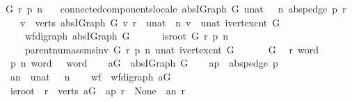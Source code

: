 \begin{isabellebody}
{\isachardoublequoteopen}{\isasymAnd}G\ r\ p\ n{\isachardot}\ \isanewline
\ \ {\isacharparenleft}connected{\isacharunderscore}components{\isacharunderscore}locale\ {\isacharparenleft}abs{\isacharunderscore}IGraph\ G{\isacharparenright}\ {\isacharparenleft}unat\ {\isasymcirc}\ \ n{\isacharparenright}\ {\isacharparenleft}abs{\isacharunderscore}pedge\ p{\isacharparenright}\ r\ \isanewline
\ \ {\isasymand}\ {\isacharparenleft}{\isasymforall}v\ {\isasymin}\ verts\ {\isacharparenleft}abs{\isacharunderscore}IGraph\ G{\isacharparenright}{\isachardot}\ v{\isasymnoteq}\ r\ {\isasymlongrightarrow}\ {\isacharparenleft}unat\ {\isasymcirc}\ n{\isacharparenright}\ v\ {\isacharless}\ unat\ {\isacharparenleft}ivertex{\isacharunderscore}cnt\ G{\isacharparenright}{\isacharparenright}{\isacharparenright}\ {\isacharequal}\ \isanewline
\ \ \ \ {\isacharparenleft}wf{\isacharunderscore}digraph\ {\isacharparenleft}abs{\isacharunderscore}IGraph\ G{\isacharparenright}\ {\isasymand}\ \isanewline
\ \ \ \ is{\isacharunderscore}root\ G\ r\ p\ n\ {\isasymand}\ \isanewline
\ \ \ \ parent{\isacharunderscore}num{\isacharunderscore}assms{\isacharunderscore}inv\ G\ r\ p\ n\ {\isacharparenleft}unat\ {\isacharparenleft}ivertex{\isacharunderscore}cnt\ G{\isacharparenright}{\isacharparenright}{\isacharparenright}{\isachardoublequoteclose}\ \isanewline
%
\isadelimproof
%
\endisadelimproof
%
\isatagproof
{}\isamarkupfalse%
\ {\isacharminus}\isanewline
\ \ \isamarkupfalse%
\ G\ \isamarkupfalse%
\ r{\isacharcolon}{\isacharcolon}{\isachardoublequoteopen}{}{}\ word{\isachardoublequoteclose}\ \isamarkupfalse%
\ p\ n{\isacharcolon}{\isacharcolon}{\isachardoublequoteopen}{}{}\ word\ {\isasymRightarrow}\ {}{}\ word{\isachardoublequoteclose}\isanewline
\ \ \isamarkupfalse%
\ {\isacharquery}aG\ {\isacharequal}\ {\isachardoublequoteopen}abs{\isacharunderscore}IGraph\ G{\isachardoublequoteclose}\isanewline
\ \ \isamarkupfalse%
\ {\isacharquery}ap\ {\isacharequal}\ {\isachardoublequoteopen}abs{\isacharunderscore}pedge\ p{\isachardoublequoteclose}\isanewline
\ \ \isamarkupfalse%
\ {\isacharquery}an\ {\isacharequal}\ {\isachardoublequoteopen}unat\ {\isasymcirc}\ \ n{\isachardoublequoteclose}\isanewline
\ \ \isamarkupfalse%
\ {\isacharquery}wf\ {\isacharequal}\ {\isachardoublequoteopen}wf{\isacharunderscore}digraph\ {\isacharquery}aG{\isachardoublequoteclose}\isanewline
\ \ \isamarkupfalse%
\ {\isacharquery}is{\isacharunderscore}root\ {\isacharequal}\ {\isachardoublequoteopen}r\ {\isasymin}\ verts\ {\isacharquery}aG\ {\isasymand}\ {\isacharquery}ap\ r\ {\isacharequal}\ None\ {\isasymand}\ {\isacharquery}an\ r\ {\isacharequal}\ {}{\isachardoublequoteclose}\isanewline

\end{isabellebody}
